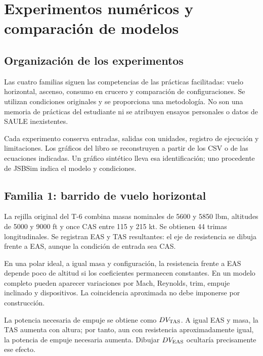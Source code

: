 \chapter{Experimentos numéricos y comparación de modelos}\label{ch:numerics}

\section{Organización de los experimentos}
Las cuatro familias siguen las competencias de las prácticas facilitadas: vuelo horizontal, ascenso, consumo en crucero y comparación de configuraciones. Se utilizan condiciones originales y se proporciona una metodología. No son una memoria de prácticas del estudiante ni se atribuyen ensayos personales o datos de SAULE inexistentes.

Cada experimento conserva entradas, salidas con unidades, registro de ejecución y limitaciones. Los gráficos del libro se reconstruyen a partir de los CSV o de las ecuaciones indicadas. Un gráfico sintético lleva esa identificación; uno procedente de JSBSim indica el modelo y condiciones.

\section{Familia 1: barrido de vuelo horizontal}
La rejilla original del T-6 combina masas nominales de 5600 y 5850 lbm, altitudes de 5000 y 9000 ft y once CAS entre 115 y 215 kt. Se obtienen 44 trimas longitudinales. Se registran EAS y TAS resultantes: el eje de resistencia se dibuja frente a EAS, aunque la condición de entrada sea CAS.

En una polar ideal, a igual masa y configuración, la resistencia frente a EAS depende poco de altitud si los coeficientes permanecen constantes. En un modelo completo pueden aparecer variaciones por Mach, Reynolds, trim, empuje inclinado y dispositivos. La coincidencia aproximada no debe imponerse por construcción.


La potencia necesaria de empuje se obtiene como $DV_{\rm TAS}$. A igual EAS y masa, la TAS aumenta con altura; por tanto, aun con resistencia aproximadamente igual, la potencia de empuje necesaria aumenta. Dibujar $DV_{\rm EAS}$ ocultaría precisamente ese efecto.

